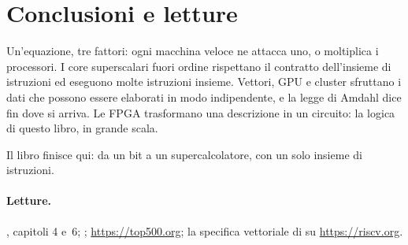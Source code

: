 \section{Conclusioni e letture}

Un'equazione, tre fattori: ogni macchina veloce ne attacca uno, o moltiplica i
processori. I core superscalari fuori ordine rispettano il contratto
dell'insieme di istruzioni ed eseguono molte istruzioni insieme. Vettori, GPU e
cluster sfruttano i dati che possono essere elaborati in modo indipendente, e
la legge di Amdahl dice fin dove si arriva. Le FPGA trasformano una descrizione
in un circuito: la logica di questo libro, in grande scala.

Il libro finisce qui: da un bit a un supercalcolatore, con un solo insieme di
istruzioni.

\paragraph{Letture.} \citet{patterson2020}, capitoli 4 e~6;
\citet{hennessy2019}; \url{https://top500.org}; la specifica vettoriale di
\riscv su \url{https://riscv.org}.
